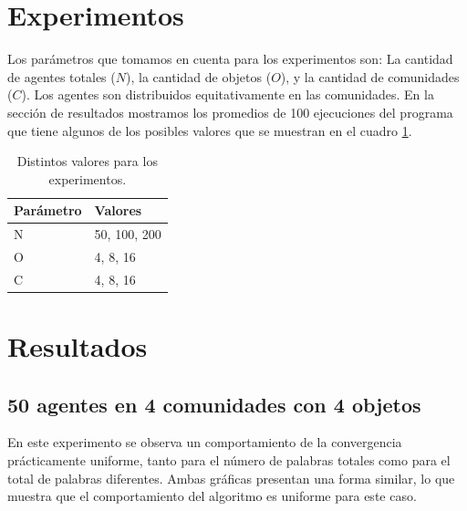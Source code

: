 \documentclass[runningheads]{llncs}
\begin{document}
\section{Experimentos}
Los parámetros que tomamos en cuenta para los experimentos son: La cantidad de agentes totales ($N$), la cantidad de objetos ($O$), y la cantidad de comunidades ($C$). Los agentes son distribuidos equitativamente en las comunidades. En la sección de resultados mostramos los promedios de 100 ejecuciones del programa que tiene algunos de los posibles valores que se muestran en el cuadro \ref{tab0}. 
\begin{table}[h]
	\centering
	\caption{Distintos valores para los experimentos.}\label{tab0}
	\begin{tabular}{|l|l|}
		\hline
		Parámetro &  Valores  \\
		\hline
		N &  50, 100, 200 \\
		\hline
		O &  4, 8, 16 \\
		\hline
		C &  4, 8, 16 \\
		\hline
	\end{tabular}
\end{table}
\section{Resultados}
\subsection{50 agentes en 4 comunidades con 4 objetos}

En este experimento se observa un comportamiento de la convergencia prácticamente uniforme, tanto para el número de palabras totales como para el total de palabras diferentes. Ambas gráficas presentan una forma similar, lo que muestra que el comportamiento del algoritmo es uniforme para este caso.
\end{document}
